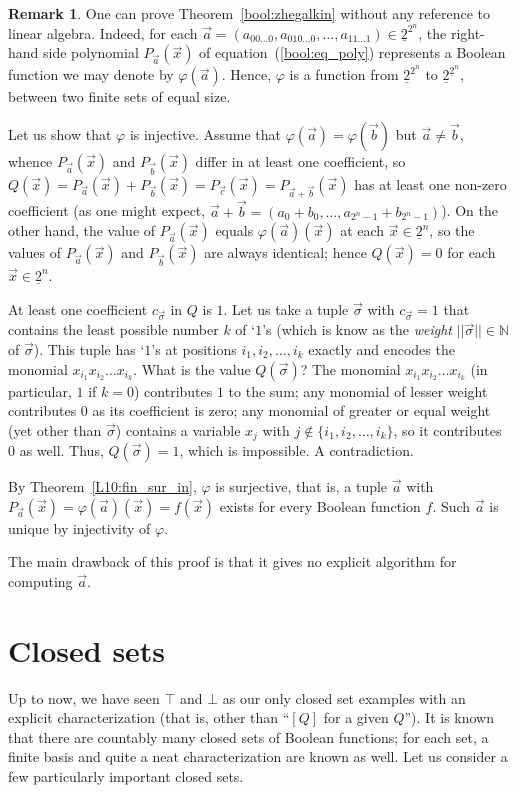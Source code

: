 \documentclass[12pt,notitlepage]{article}
\theoremstyle{plain}
\theoremstyle{definition}
\newtheorem{rem}[thm]{Remark}
\theoremstyle{plain}
\newcommand{\N}{\mathbb{N}}
\renewcommand{\phi}{\varphi}
\newcommand{\ul}[1]{\underline{#1}}
\newcommand{\1}{\mathbf{1}}
\newcommand{\0}{\mathbf{0}}
\begin{document}
\begin{rem}
One can prove Theorem~\ref{bool:zhegalkin} without any reference to linear algebra. Indeed, for each $\vec a = (a_{00\ldots0}, a_{010\ldots0}, \ldots, a_{11\ldots1}) \in \ul{2}^{2^n}$, the right-hand side polynomial $P_{\vec a}(\vec x)$ of equation~(\ref{bool:eq_poly}) represents a Boolean function we may denote by $\phi(\vec a)$. Hence, $\phi$ is a function from $\ul{2}^{2^n}$ to $\ul{2}^{\ul{2}^n}$, between two finite sets of equal size.

Let us show that $\phi$ is injective. Assume that $\phi(\vec a) = \phi(\vec b)$ but $\vec a \neq \vec b$, whence $P_{\vec a}(\vec x)$ and $P_{\vec b}(\vec x)$ differ in at least one coefficient, so  $Q(\vec x) = P_{\vec a}(\vec x)+ P_{\vec b}(\vec x) = P_{\vec c}(\vec x) = P_{\vec a + \vec b}(\vec x)$ has at least one non-zero coefficient (as one might expect, $\vec a + \vec b = (a_0 + b_0, \ldots, a_{2^n - 1} + b_{2^n - 1})$). On the other hand, the value of $P_{\vec a}(\vec x)$ equals $\phi(\vec a)(\vec x)$ at each $\vec x \in \ul{2}^n$, so the values of $P_{\vec a}(\vec x)$ and $P_{\vec b}(\vec x)$ are always identical; hence $Q(\vec x) = 0$ for each $\vec x \in \ul{2}^n$.

At least one coefficient $c_{\vec \sigma}$ in $Q$ is $1$. Let us take a tuple $\vec \sigma$ with $c_{\vec \sigma} = 1$ that contains the least possible number $k$ of `$1$'s (which is know as the \emph{weight} $||\vec \sigma|| \in \N$ of $\vec\sigma$). This tuple has `$1$'s at positions $i_1, i_2, \ldots, i_k$ exactly and encodes the monomial $x_{i_1} x_{i_2} \ldots x_{i_k}$. What is the value $Q(\vec \sigma)$? The monomial $x_{i_1} x_{i_2} \ldots x_{i_k}$ (in particular, $1$ if $k = 0$) contributes $1$ to the sum; any monomial of lesser weight contributes $0$ as its coefficient is zero; any monomial of greater or equal weight (yet other than $\vec \sigma$) contains a variable $x_j$ with $j \notin \{i_1, i_2, \ldots, i_k \}$, so it contributes $0$ as well. Thus, $Q(\vec \sigma) = 1$, which is impossible. A contradiction.

By Theorem~\ref{L10:fin_sur_in}, $\phi$ is surjective, that is, a tuple $\vec a$ with $P_{\vec a}(\vec x) = \phi(\vec a)(\vec x) = f(\vec x)$ exists for every Boolean function $f$. Such $\vec a$ is unique by injectivity of $\phi$.

The main drawback of this proof is that it gives no explicit algorithm for computing $\vec a$.
\end{rem}

\section{Closed sets}
Up to now, we have seen $\top$ and $\bot$ as our only closed set examples with an explicit characterization (that is, other than ``$[Q]$ for a given $Q$''). It is known that there are countably many closed sets of Boolean functions; for each set, a finite basis and quite a neat characterization are known as well. Let us consider a few particularly important closed sets.
\end{document}
